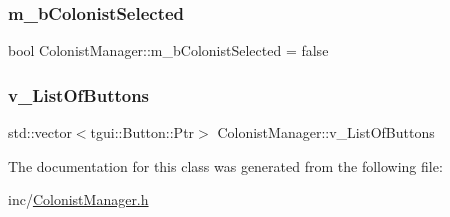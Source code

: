 \subsubsection{\texorpdfstring{m\+\_\+b\+Colonist\+Selected}{m\_bColonistSelected}}
{\footnotesize\ttfamily bool Colonist\+Manager\+::m\+\_\+b\+Colonist\+Selected = false}

\mbox{\label{class_colonist_manager_a450c58b087a8c44286bddacf36c51811}} 
\subsubsection{\texorpdfstring{v\+\_\+\+List\+Of\+Buttons}{v\_ListOfButtons}}
{\footnotesize\ttfamily std\+::vector$<$tgui\+::\+Button\+::\+Ptr$>$ Colonist\+Manager\+::v\+\_\+\+List\+Of\+Buttons}



The documentation for this class was generated from the following file\+:\begin{DoxyCompactItemize}
\item 
inc/\mbox{\hyperlink{_colonist_manager_8h}{Colonist\+Manager.\+h}}\end{DoxyCompactItemize}
